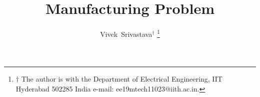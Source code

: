 \documentclass[journal,12pt,onecolumn]{IEEEtran}
\begin{document}
\providecommand{\nCr}[2]{\,^{#1}C_{#2}} %
\providecommand{\nPr}[2]{\,^{#1}P_{#2}} %
\providecommand{\mbf}{\mathbf}
\providecommand{\pr}[1]{\ensuremath{\Pr\left(#1\right)}}
\providecommand{\qfunc}[1]{\ensuremath{Q\left(#1\right)}}
\providecommand{\sbrak}[1]{\ensuremath{{}\left[#1\right]}}
\providecommand{\lsbrak}[1]{\ensuremath{{}\left[#1\right.}}
\providecommand{\rsbrak}[1]{\ensuremath{{}\left.#1\right]}}
\providecommand{\brak}[1]{\ensuremath{\left(#1\right)}}
\providecommand{\lbrak}[1]{\ensuremath{\left(#1\right.}}
\providecommand{\rbrak}[1]{\ensuremath{\left.#1\right)}}
\providecommand{\cbrak}[1]{\ensuremath{\left\{#1\right\}}}
\providecommand{\lcbrak}[1]{\ensuremath{\left\{#1\right.}}
\providecommand{\rcbrak}[1]{\ensuremath{\left.#1\right\}}}
\newcommand{\sgn}{\mathop{\mathrm{sgn}}}
\providecommand{\abs}[1]{\left\vert#1\right\vert}
\providecommand{\res}[1]{\Res\displaylimits_{#1}} 
\providecommand{\norm}[1]{\lVert#1\rVert}
\providecommand{\mtx}[1]{\mathbf{#1}}
\providecommand{\mean}[1]{E\left[ #1 \right]}
\providecommand{\fourier}{\overset{\mathcal{F}}{ \rightleftharpoons}}
\providecommand{\hilbert}{\overset{\mathcal{H}}{ \rightleftharpoons}}
\providecommand{\system}{\overset{\mathcal{H}}{ \longleftrightarrow}}

\newcommand{\solution}{\noindent \textbf{Solution: }}
\providecommand{\dec}[2]{\ensuremath{\overset{#1}{\underset{#2}{\gtrless}}}}
\title{ 
Manufacturing Problem
}
\author{Vivek~Srivastava$^{\dagger}$ %
\thanks{$\dagger$ The author is with the Department of Electrical Engineering, IIT Hyderabad
502285 India e-mail: ee19mtech11023@iith.ac.in. }
}
\maketitle
\end{document}
